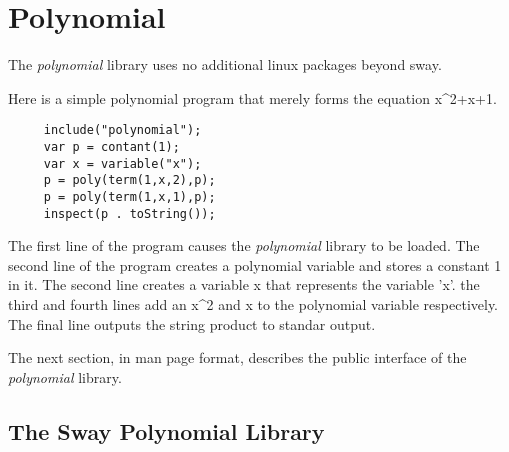 \section{Polynomial}

The {\it polynomial} library uses no additional linux packages beyond 
sway.

Here is a simple polynomial program that merely forms the equation 
x^2+x+1.

\color{CodeGreen}
\begin{codesize}
\begin{verbatim}
     include("polynomial");
     var p = contant(1);
     var x = variable("x");
     p = poly(term(1,x,2),p);
     p = poly(term(1,x,1),p);
     inspect(p . toString());
\end{verbatim}
\end{codesize}
\color{black}

The first line of the program causes the {\it polynomial} library to be 
loaded. The second line of the program creates a polynomial variable and 
stores a constant 1 in it. The second line creates a variable x that 
represents the variable 'x'. the third and fourth lines add an x^2 and x 
to the polynomial variable respectively. The final line outputs the 
string product to standar output.

The next section, in man page format, describes the public interface of 
the {\it polynomial} library.

\subsection*{The Sway Polynomial Library}

